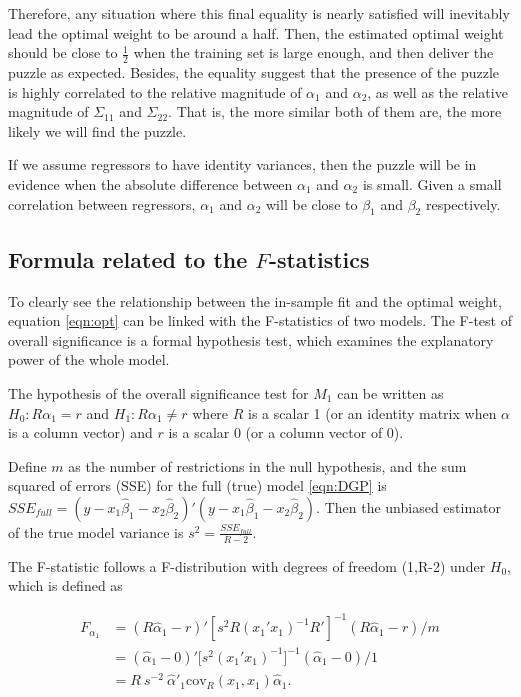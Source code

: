 \documentclass{monashthesis}
\begin{document}
Therefore, any situation where this final equality is nearly satisfied will inevitably lead the optimal weight to be around a half. Then, the estimated optimal weight should be close to \(\frac{1}{2}\) when the training set is large enough, and then deliver the puzzle as expected. Besides, the equality suggest that the presence of the puzzle is highly correlated to the relative magnitude of \(\alpha_1\) and \(\alpha_2\), as well as the relative magnitude of \(\Sigma_{11}\) and \(\Sigma_{22}\). That is, the more similar both of them are, the more likely we will find the puzzle.

If we assume regressors to have identity variances, then the puzzle will be in evidence when the absolute difference between \(\alpha_1\) and \(\alpha_2\) is small. Given a small correlation between regressors, \(\alpha_1\) and \(\alpha_2\) will be close to \(\beta_1\) and \(\beta_2\) respectively.

\hypertarget{formula-related-to-the-f-statistics}{%
\subsection{\texorpdfstring{Formula related to the \(F\)-statistics}{Formula related to the F-statistics}}\label{formula-related-to-the-f-statistics}}

To clearly see the relationship between the in-sample fit and the optimal weight, equation \ref{eqn:opt} can be linked with the F-statistics of two models. The F-test of overall significance is a formal hypothesis test, which examines the explanatory power of the whole model.

The hypothesis of the overall significance test for \(M_1\) can be written as \(H_0: R\alpha_1 = r\) and \(H_1: R\alpha_1 \ne r\) where \(R\) is a scalar 1 (or an identity matrix when \(\alpha\) is a column vector) and \(r\) is a scalar 0 (or a column vector of 0).

Define \(m\) as the number of restrictions in the null hypothesis, and the sum squared of errors (SSE) for the full (true) model \ref{eqn:DGP} is \(SSE_{full} = (y - x_1 \hat\beta_1 - x_2 \hat\beta_2)'(y - x_1 \hat\beta_1 - x_2 \hat\beta_2)\). Then the unbiased estimator of the true model variance is \(s^2=\frac{SSE_{full}}{R-2}\).

The F-statistic follows a F-distribution with degrees of freedom (1,R-2) under \(H_0\), which is defined as

\begin{align*}
F_{\alpha_1} &= (R\hat\alpha_1 - r)'[s^2R(x_1'x_1)^{-1}R']^{-1}(R\hat\alpha_1 - r)/m \\
&= (\hat\alpha_1 - 0)' \Big[s^2(x_1'x_1)^{-1}\Big]^{-1} (\hat\alpha_1 - 0)/1 \\
&= R \ s^{-2} \ \hat\alpha'_1 \text{cov}_R(x_1,x_1) \hat\alpha_1. \\
\end{align*}
\end{document}
